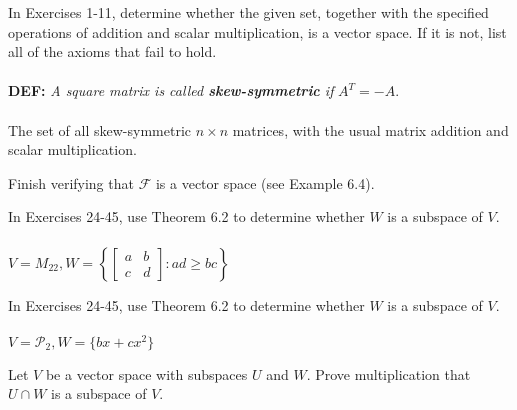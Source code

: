 \documentclass[12pt,letterpaper]{hmcpset}
\newcommand{\m}[1]{\begin{bmatrix} #1 \end{bmatrix}}
\begin{document}

\begin{problem}[6.1.11]
    In Exercises 1-11, determine whether the given set, together with
    the specified operations of addition and scalar multiplication, is
    a vector space. If it is not, list all of the axioms that fail to
    hold.\\\\
    \textbf{DEF:} \textit{A square matrix is called \textbf{skew-symmetric} if}
    $A^{T}=-A$.\\\\
    The set of all skew-symmetric $n\times n$ matrices, with the usual matrix
    addition and scalar multiplication.
\end{problem}
\begin{solution}
    \vfill
\end{solution}
\newpage

\begin{problem}[6.1.13]
    Finish verifying that $\mathscr{F}$ is a vector space (see Example 6.4).
\end{problem}
\begin{solution}
    \vfill
\end{solution}
\newpage

\begin{problem}[6.1.29]
    In Exercises 24-45, use Theorem 6.2 to determine whether $W$ is a
    subspace of $V$.\\\\
    $V=M_{22},W=\left\{\m{a&b\\c&d}:ad\geq bc\right\}$
\end{problem}
\begin{solution}
    \vfill
\end{solution}
\newpage

\begin{problem}[6.1.34]
    In Exercises 24-45, use Theorem 6.2 to determine whether $W$ is a
    subspace of $V$.\\\\
    $V=\mathscr{P}_2,W=\{bx + cx^2\}$
\end{problem}
\begin{solution}
    \vfill
\end{solution}
\newpage

\begin{problem}[6.1.46]
    Let $V$ be a vector space with subspaces $U$ and $W$. Prove
    multiplication that $U\cap W$ is a subspace of $V$.
\end{problem}
\begin{solution}
    \vfill
\end{solution}
\newpage
\end{document}
